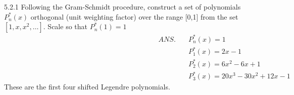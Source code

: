 
\begin{center}
{\Large{}}
\end{center}


\begin{mybox}{5.2.1}
Following the Gram-Schmidt procedure, construct a set of polynomials $P_{n}^{*}(x)$ orthogonal (unit weighting factor) over the range [0,1] from the set $\left[1, x, x^{2}, \ldots\right] .$ Scale so that $P_{n}^{*}(1)=1$
$$
\hspace{9cm}\begin{aligned}
ANS. \quad & P_{n}^{*}(x)=1 \\
& P_{1}^{*}(x)=2 x-1 \\
& P_{2}^{*}(x)=6 x^{2}-6 x+1 \\
& P_{3}^{*}(x)=20 x^{3}-30 x^{2}+12 x-1
\end{aligned}
$$
These are the first four shifted Legendre polynomials.
\end{mybox}


